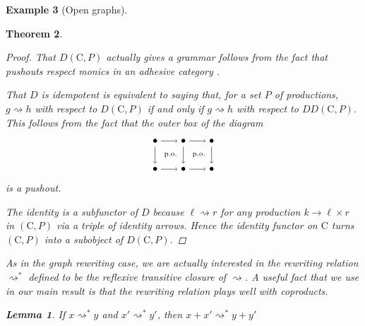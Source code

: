 \documentclass{amsart}
\newcommand{\C}{\cat{C}}
\newcommand{\cat}[1]{\mathrm{#1}}
\newcommand{\dderiv}[2]{#1 \rightsquigarrow #2}
\newcommand{\deriv}[2]{#1 \rightsquigarrow^\ast #2}
\newcommand{\spn}[3]{#2 \to #1 \times #3}
\newcommand{\spn}[3]{#2 \to #1 \times #3}
\newtheorem{theorem}{Theorem}[section]
\newtheorem{lemma}[theorem]{Lemma}
\theoremstyle{remark}
\theoremstyle{definition}
\newtheorem{example}[theorem]{Example}
\begin{document}
\begin{example}[Open graphs]
{{\begin{theorem}
\begin{proof}
  That $ D ( \C , P ) $ actually gives a grammar follows from the fact
  that pushouts respect monics in an adhesive category
  \cite[Lem.~12]{LackSobo_Adhesive}.
  
  That $ D $ is idempotent is equivalent to saying that, for a set
  $ P $ of productions, $ \dderiv{g}{h} $ with respect to
  $ D ( \C , P ) $ if and only if $ \dderiv{g}{h} $ with respect to
  $ DD ( \C , P ) $. This follows from the fact that the outer box of
  the diagram
    \[
      \begin{tikzpicture}
        \node (1) at (0,1) {\( \bullet \)};
        \node (2) at (1,1) {\( \bullet \)};
        \node (3) at (2,1) {\( \bullet \)};
        \node (4) at (0,0) {\( \bullet \)};
        \node (5) at (1,0) {\( \bullet \)};
        \node (6) at (2,0) {\( \bullet \)};
        \draw [->] (1) to node [] {\scriptsize{\(  \)}} (2);
        \draw [->] (2) to node [] {\scriptsize{\(  \)}} (3);
        \draw [->] (4) to node [] {\scriptsize{\(  \)}} (5);
        \draw [->] (5) to node [] {\scriptsize{\(  \)}} (6);
        \draw [->] (1) to node [] {\scriptsize{\(  \)}} (4);
        \draw [->] (2) to node [] {\scriptsize{\(  \)}} (5);
        \draw [->] (3) to node [] {\scriptsize{\(  \)}} (6);
        \node () at (0.5,0.5) {\scriptsize{ p.o.\ }};
        \node () at (1.5,0.5) {\scriptsize{ p.o.\ }};
      \end{tikzpicture}
    \]
    is a pushout.

    The identity is a subfunctor of $ D $ because $ \dderiv{\ell}{r} $
    for any production $ \spn{\ell }{k}{r} $ in $ ( \C , P ) $ via a
    triple of identity arrows. Hence the identity functor on $ \C $
    turns $ ( \C , P ) $ into a subobject of $ D ( \C , P ) $.  
\end{proof}

As in the graph rewriting case, we are actually interested in the
rewriting relation $ \deriv{}{} $ defined to be the reflexive
transitive closure of $ \dderiv{}{} $.  A useful fact that we use in
our main result is that the rewriting relation plays well with
coproducts.

\begin{lemma}
\label{thm:rewrite-rel-is-additive}
  If $ \deriv{x}{y} $ and $ \deriv{x'}{y'} $, then $ \deriv{x+x'}{y+y'} $
\end{lemma}


\end{theorem}}}
\end{example}
\end{document}

